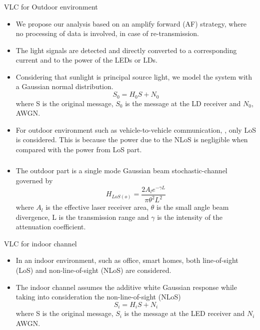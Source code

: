 \documentclass{beamer}
\begin{document}
\begin{frame}
  \frametitle{}
  \begin{block}{VLC for Outdoor environment}
  \begin{itemize}
      \item We propose our analysis based on an amplify forward (AF) strategy, where no processing of data is involved, in case of re-transmission.
      \item The light signals are detected and directly converted to a corresponding current and to the power of the LEDs or LDs.
      \item Considering that sunlight is principal source light, we model the system with a Gaussian normal distribution.
        \begin{equation}
         S_0 = H_0 S + N_0
        \end{equation}
        where S is the original message, $S_0$ is the message at the LD receiver and $N_0$, AWGN.
        \item For outdoor environment such as vehicle-to-vehicle communication, , only LoS is considered. This is because the power due to the NLoS is negligible when compared with the power from LoS part.
  \end{itemize}
  \end{block}
\end{frame}

\begin{frame}
  \frametitle{}
  \begin{block}{}
  \begin{itemize}
  \item The outdoor part is a single mode Gaussian beam stochastic-channel governed by
        \begin{equation}
            H_{LoS(o)} = \frac{2 A_l e^{-\gamma L}}{\pi \theta^2 L^2 }
        \end{equation}
   where $A_l$ is the effective laser receiver area, $\theta$ is the small angle beam divergence, L is the transmission range and $\gamma$ is the intensity of the attenuation coefficient.
  \end{itemize}
    \end{block}
\begin{block}{VLC for indoor channel}
\begin{itemize}
    \item In an indoor environment, such as office, smart homes, both line-of-sight (LoS) and non-line-of-sight (NLoS) are considered. 
    \item The indoor channel assumes the additive white Gaussian response while taking into consideration the non-line-of-sight (NLoS)
    \begin{equation}
         S_i = H_i S + N_i
        \end{equation}
    where S is the original message, $S_i$ is the message at the LED receiver and $N_i$ AWGN.
\end{itemize}
\end{block}
\end{frame}
\end{document}
